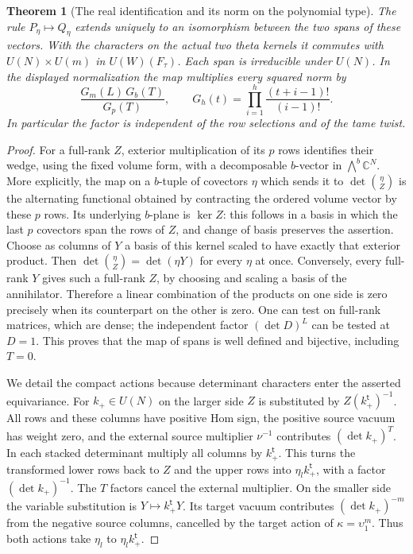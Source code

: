\documentclass[a4paper,11pt]{article}
\newtheorem{theorem}[proposition]{Theorem}
\theoremstyle{definition}
\theoremstyle{remark}
\numberwithin{equation}{section}
\begin{document}
\begin{theorem}[The real identification and its norm on the polynomial type]
\leavevmode\label{thm:thirdreal838}
The rule \(P_\eta\mapsto Q_\eta\) extends uniquely to an
isomorphism between the two spans of these vectors. With
the characters on the actual two theta kernels it commutes
with \(U(N)\times U(m)\) in \(U(W)(F_\tau)\). Each span is
irreducible under \(U(N)\). In the displayed normalization
the map multiplies every squared norm by
\[
      \frac{G_m(L)\,G_b(T)}{G_p(T)},\qquad
      G_h(t)=\prod_{i=1}^h\frac{(t+i-1)!}{(i-1)!}.
\]
In particular the factor is independent of the row selections
and of the tame twist.
\end{theorem}
\begin{proof}
For a full-rank \(Z\), exterior multiplication of its \(p\)
rows identifies their wedge, using the fixed volume form,
with a decomposable \(b\)-vector in \(\bigwedge^b\mathbb C^N\).
More explicitly, the map on a \(b\)-tuple of covectors
\(\eta\) which sends it to \(\det\binom{\eta}{Z}\) is the
alternating functional obtained by contracting the ordered
volume vector by these \(p\) rows. Its underlying \(b\)-plane
is \(\ker Z\): this follows in a basis in which the last
\(p\) covectors span the rows of \(Z\), and change of basis
preserves the assertion. Choose as columns of \(Y\) a basis
of this kernel scaled to have exactly that exterior product.
Then \(\det\binom{\eta}{Z}=\det(\eta Y)\) for every \(\eta\)
at once. Conversely, every full-rank \(Y\) gives such a
full-rank \(Z\), by choosing and scaling a basis of the
annihilator. Therefore a linear combination of the products
on one side is zero precisely when its counterpart on the
other is zero. One can test on full-rank matrices, which
are dense; the independent factor \((\det D)^L\) can be
tested at \(D=1\). This proves that the map of spans is
well defined and bijective, including \(T=0\).

We detail the compact actions because determinant characters
enter the asserted equivariance. For \(k_+\in U(N)\) on the
larger side \(Z\) is substituted by
\(Z(k_+^{\mathsf t})^{-1}\). All rows and these columns have
positive Hom sign, the positive source vacuum has weight zero,
and the external source multiplier \(\nu^{-1}\) contributes
\((\det k_+)^T\). In each stacked determinant multiply all
columns by \(k_+^{\mathsf t}\). This turns the transformed
lower rows back to \(Z\) and the upper rows into
\(\eta_l k_+^{\mathsf t}\), with a factor
\((\det k_+)^{-1}\). The \(T\) factors cancel the external
multiplier. On the smaller side the variable substitution is
\(Y\mapsto k_+^{\mathsf t}Y\). Its target vacuum contributes
\((\det k_+)^{-m}\) from the negative source columns, cancelled
by the target action of \(\kappa=\upsilon_1^m\).
Thus both actions take \(\eta_l\) to \(\eta_l k_+^{\mathsf t}\).


\end{proof}
\end{document}
